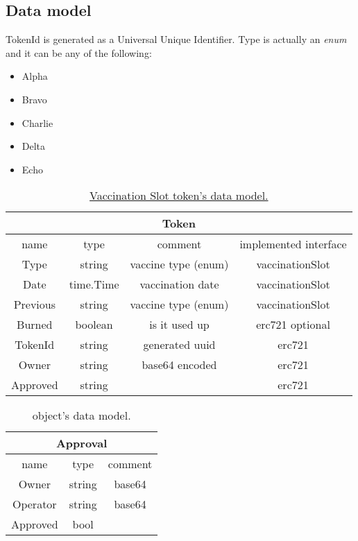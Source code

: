\subsection{Data model}
TokenId is generated as a Universal Unique Identifier. Type is actually an \emph{enum} and it can be any of the following:
\begin{itemize}
  \item Alpha
  \item Bravo
  \item Charlie
  \item Delta
  \item Echo
\end{itemize}

\begin{center}
  \begin{table}[!ht]
    \centering
    \begin{tabular}{|c | c | c | c |}
      \hline
      \multicolumn{4}{|c|}{Token}                                        \\
      \hline
      name     & type      & comment             & implemented interface \\
      \hline
      Type     & string    & vaccine type (enum) & vaccinationSlot       \\
      Date     & time.Time & vaccination date    & vaccinationSlot       \\
      Previous & string    & vaccine type (enum) & vaccinationSlot       \\
      Burned   & boolean   & is it used up       & erc721 optional       \\
      TokenId  & string    & generated uuid      & erc721                \\
      Owner    & string    & base64 encoded      & erc721                \\
      Approved & string    &                     & erc721                \\
      \hline
    \end{tabular}
    \caption{\href{https://pkg.go.dev/github.com/perryd01/vaccination-slot/chaincode\#VaccinationSlot}{Vaccination Slot token's data model.}}
  \end{table}
\end{center}


\begin{center}
  \begin{table}[!ht]
    \centering
    \begin{tabular}{| c | c |c|}
      \hline
      \multicolumn{3}{|c|}{Approval} \\
      \hline
      name     & type   & comment    \\
      \hline
      Owner    & string & base64     \\
      Operator & string & base64     \\
      Approved & bool   &            \\
      \hline
    \end{tabular}
    \caption{ object's data model.}
  \end{table}
\end{center}

